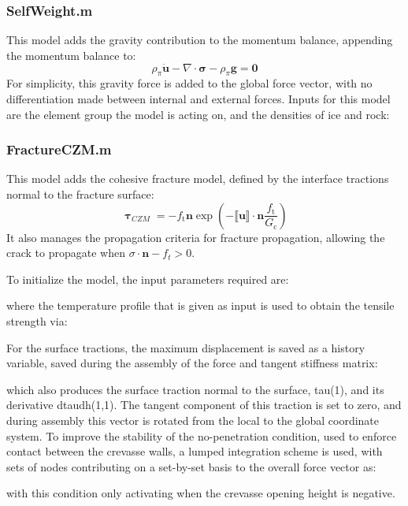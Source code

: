 \documentclass[3p]{elsarticle} %
\begin{document}
\subsubsection{SelfWeight.m}
This model adds the gravity contribution to the momentum balance, appending the momentum balance to:
\begin{equation}
	\rho_\pi \ddot{\mathbf{u}} - \nabla \cdot \mathbf{\sigma} - \rho_\pi \mathbf{g}= \mathbf{0}
\end{equation}
For simplicity, this gravity force is added to the global force vector, with no differentiation made between internal and external forces. Inputs for this model are the element group the model is acting on, and the densities of ice and rock:


\subsubsection{FractureCZM.m}
This model adds the cohesive fracture model, defined by the interface tractions normal to the fracture surface:
\begin{equation}
    \mathbf{\uptau}_{CZM} = -f_\mathrm{t} \mathbf{n} \exp\left(-\llbracket \mathbf{u} \rrbracket \cdot \mathbf{n} \frac{f_\mathrm{t}}{G_\mathrm{c}}\right)
\end{equation}
It also manages the propagation criteria for fracture propagation, allowing the crack to propagate when $\sigma\cdot \mathbf{n}-f_t>0$. 

To initialize the model, the input parameters required are:

where the temperature profile that is given as input is used to obtain the tensile strength via:


For the surface tractions, the maximum displacement is saved as a history variable, saved during the assembly of the force and tangent stiffness matrix:

which also produces the surface traction normal to the surface, tau(1), and its derivative dtaudh(1,1). The tangent component of this traction is set to zero, and during assembly this vector is rotated from the local to the global coordinate system. To improve the stability of the no-penetration condition, used to enforce contact between the crevasse walls, a lumped integration scheme is used, with sets of nodes contributing on a set-by-set basis to the overall force vector as:

with this condition only activating when the crevasse opening height is negative. 
\end{document}
